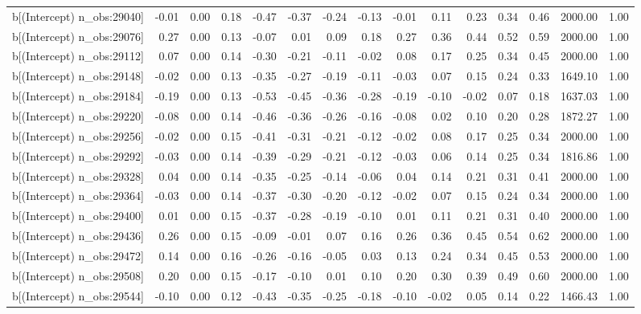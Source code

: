 \begin{table}[ht]
\begin{tabular}{rrrrrrrrrrrrrrr}
  b[(Intercept) n\_obs:29040] & -0.01 & 0.00 & 0.18 & -0.47 & -0.37 & -0.24 & -0.13 & -0.01 & 0.11 & 0.23 & 0.34 & 0.46 & 2000.00 & 1.00 \\ 
  b[(Intercept) n\_obs:29076] & 0.27 & 0.00 & 0.13 & -0.07 & 0.01 & 0.09 & 0.18 & 0.27 & 0.36 & 0.44 & 0.52 & 0.59 & 2000.00 & 1.00 \\ 
  b[(Intercept) n\_obs:29112] & 0.07 & 0.00 & 0.14 & -0.30 & -0.21 & -0.11 & -0.02 & 0.08 & 0.17 & 0.25 & 0.34 & 0.45 & 2000.00 & 1.00 \\ 
  b[(Intercept) n\_obs:29148] & -0.02 & 0.00 & 0.13 & -0.35 & -0.27 & -0.19 & -0.11 & -0.03 & 0.07 & 0.15 & 0.24 & 0.33 & 1649.10 & 1.00 \\ 
  b[(Intercept) n\_obs:29184] & -0.19 & 0.00 & 0.13 & -0.53 & -0.45 & -0.36 & -0.28 & -0.19 & -0.10 & -0.02 & 0.07 & 0.18 & 1637.03 & 1.00 \\ 
  b[(Intercept) n\_obs:29220] & -0.08 & 0.00 & 0.14 & -0.46 & -0.36 & -0.26 & -0.16 & -0.08 & 0.02 & 0.10 & 0.20 & 0.28 & 1872.27 & 1.00 \\ 
  b[(Intercept) n\_obs:29256] & -0.02 & 0.00 & 0.15 & -0.41 & -0.31 & -0.21 & -0.12 & -0.02 & 0.08 & 0.17 & 0.25 & 0.34 & 2000.00 & 1.00 \\ 
  b[(Intercept) n\_obs:29292] & -0.03 & 0.00 & 0.14 & -0.39 & -0.29 & -0.21 & -0.12 & -0.03 & 0.06 & 0.14 & 0.25 & 0.34 & 1816.86 & 1.00 \\ 
  b[(Intercept) n\_obs:29328] & 0.04 & 0.00 & 0.14 & -0.35 & -0.25 & -0.14 & -0.06 & 0.04 & 0.14 & 0.21 & 0.31 & 0.41 & 2000.00 & 1.00 \\ 
  b[(Intercept) n\_obs:29364] & -0.03 & 0.00 & 0.14 & -0.37 & -0.30 & -0.20 & -0.12 & -0.02 & 0.07 & 0.15 & 0.24 & 0.34 & 2000.00 & 1.00 \\ 
  b[(Intercept) n\_obs:29400] & 0.01 & 0.00 & 0.15 & -0.37 & -0.28 & -0.19 & -0.10 & 0.01 & 0.11 & 0.21 & 0.31 & 0.40 & 2000.00 & 1.00 \\ 
  b[(Intercept) n\_obs:29436] & 0.26 & 0.00 & 0.15 & -0.09 & -0.01 & 0.07 & 0.16 & 0.26 & 0.36 & 0.45 & 0.54 & 0.62 & 2000.00 & 1.00 \\ 
  b[(Intercept) n\_obs:29472] & 0.14 & 0.00 & 0.16 & -0.26 & -0.16 & -0.05 & 0.03 & 0.13 & 0.24 & 0.34 & 0.45 & 0.53 & 2000.00 & 1.00 \\ 
  b[(Intercept) n\_obs:29508] & 0.20 & 0.00 & 0.15 & -0.17 & -0.10 & 0.01 & 0.10 & 0.20 & 0.30 & 0.39 & 0.49 & 0.60 & 2000.00 & 1.00 \\ 
  b[(Intercept) n\_obs:29544] & -0.10 & 0.00 & 0.12 & -0.43 & -0.35 & -0.25 & -0.18 & -0.10 & -0.02 & 0.05 & 0.14 & 0.22 & 1466.43 & 1.00 \\ 

\end{tabular}
\end{table}
